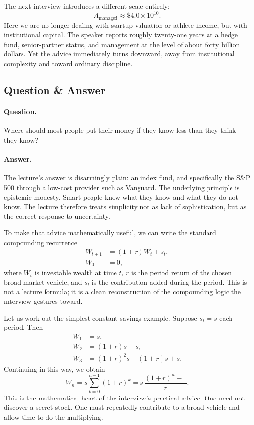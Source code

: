 The next interview introduces a different scale entirely:
\begin{equation}
A_{\text{managed}} \approx \$4.0 \times 10^{10}.
\end{equation}
Here we are no longer dealing with startup valuation or athlete income, but with institutional capital. The speaker reports roughly twenty-one years at a hedge fund, senior-partner status, and management at the level of about forty billion dollars. Yet the advice immediately turns downward, away from institutional complexity and toward ordinary discipline.

\subsection{Question \& Answer}

\paragraph{Question.} Where should most people put their money if they know less than they think they know?

\paragraph{Answer.} The lecture's answer is disarmingly plain: an index fund, and specifically the S\&P 500 through a low-cost provider such as Vanguard. The underlying principle is epistemic modesty. Smart people know what they know and what they do not know. The lecture therefore treats simplicity not as lack of sophistication, but as the correct response to uncertainty.

To make that advice mathematically useful, we can write the standard compounding recurrence
\begin{align}
W_{t+1} &= (1+r)W_t + s_t,\\
W_0 &= 0,
\end{align}
where \(W_t\) is investable wealth at time \(t\), \(r\) is the period return of the chosen broad market vehicle, and \(s_t\) is the contribution added during the period. This is not a lecture formula; it is a clean reconstruction of the compounding logic the interview gestures toward.

Let us work out the simplest constant-savings example. Suppose \(s_t=s\) each period. Then
\begin{align}
W_1 &= s,\\
W_2 &= (1+r)s + s,\\
W_3 &= (1+r)^2s + (1+r)s + s.
\end{align}
Continuing in this way, we obtain
\begin{equation}
W_n = s\sum_{k=0}^{n-1}(1+r)^k
    = s\,\frac{(1+r)^n-1}{r}.
\end{equation}
This is the mathematical heart of the interview's practical advice. One need not discover a secret stock. One must repeatedly contribute to a broad vehicle and allow time to do the multiplying.


